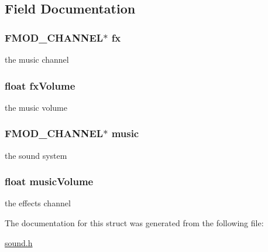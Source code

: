 \subsection{Field Documentation}
\hypertarget{struct_sound_a259d72174e26b5bb58146484cd54c1c8}{
\subsubsection[{fx}]{\setlength{\rightskip}{0pt plus 5cm}F\-M\-O\-D\-\_\-\-C\-H\-A\-N\-N\-E\-L$\ast$ fx}}\label{struct_sound_a259d72174e26b5bb58146484cd54c1c8}
the music channel \hypertarget{struct_sound_aedb4246a8bbae1c53f2f29572674b054}{
\subsubsection[{fx\-Volume}]{\setlength{\rightskip}{0pt plus 5cm}float fx\-Volume}}\label{struct_sound_aedb4246a8bbae1c53f2f29572674b054}
the music volume \hypertarget{struct_sound_acca26c408c6140c8cdc0d8f49d31ad4a}{
\subsubsection[{music}]{\setlength{\rightskip}{0pt plus 5cm}F\-M\-O\-D\-\_\-\-C\-H\-A\-N\-N\-E\-L$\ast$ music}}\label{struct_sound_acca26c408c6140c8cdc0d8f49d31ad4a}
the sound system \hypertarget{struct_sound_a6f06b572245c72c79f052b7efb89dc3b}{
\subsubsection[{music\-Volume}]{\setlength{\rightskip}{0pt plus 5cm}float music\-Volume}}\label{struct_sound_a6f06b572245c72c79f052b7efb89dc3b}
the effects channel 

The documentation for this struct was generated from the following file\-:\begin{DoxyCompactItemize}
\item 
\hyperlink{sound_8h}{sound.\-h}\end{DoxyCompactItemize}
